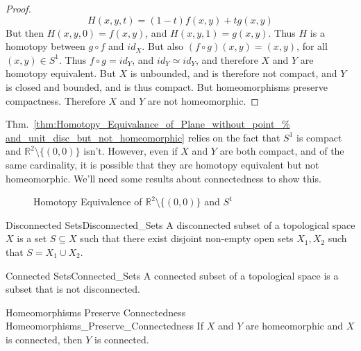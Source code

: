 \documentclass[crop=false,class=book,oneside]{standalone}                      %
\begin{document}
\begin{proof}
                \begin{equation}
                    H(x,y,t)=(1-t)f(x,y)+tg(x,y)
                \end{equation}
                But then $H(x,y,0)=f(x,y)$, and $H(x,y,1)=g(x,y)$. Thus $H$ is a
                homotopy between ${g}\circ{f}$ and $id_{X}$. But also
                $({f}\circ{g})(x,y)=(x,y)$, for all $(x,y)\in S^{1}$.
                Thus ${f}\circ{g}=id_{Y}$, and ${id_{Y}}\simeq{id_{Y}}$,
                and therefore $X$ and $Y$ are homotopy equivalent.
                But $X$ is unbounded, and is therefore not compact,
                and $Y$ is closed and bounded, and is thus compact.
                But homeomorphisms preserve compactness. Therefore $X$
                and $Y$ are not homeomorphic.
            \end{proof}
            Thm.~\ref{thm:Homotopy_Equivalance_of_Plane_without_point_%
                      and_unit_disc_but_not_homeomorphic}
            relies on the fact that $S^{1}$ is compact and
            $\mathbb{R}^{2}\setminus\{(0,0)\}$ isn't. However, even if $X$ and
            $Y$ are both compact, and of the same cardinality, it is possible
            that they are homotopy equivalent but not homeomorphic. We'll need
            some results about connectedness to show this.
            \begin{figure}[H]
                \captionsetup{type=figure}
                \centering
                
                \caption{Homotopy Equivalence of
                         $\mathbb{R}^{2}\setminus\{(0,0)\}$ and $S^{1}$}
                \label{fig:homotopy_equivalence_between_the_plane_%
                       with_a_point_removed_and_the_unit_circle}
            \end{figure}
            \begin{ldefinition}{Disconnected Sets}{Disconnected_Sets}
                A disconnected subset of a topological space $X$ is a set
                $S\subseteq{X}$ such that there exist disjoint non-empty open
                sets $X_{1},X_{2}$ such that $S=X_{1}\cup{X_{2}}$.
            \end{ldefinition}
            \begin{ldefinition}{Connected Sets}{Connected_Sets}
                A connected subset of a topological space
                is a subset that is not disconnected.
            \end{ldefinition}
            \begin{ltheorem}{Homeomorphisms Preserve Connectedness}
                            {Homeomorphisms_Preserve_Connectedness}
                If $X$ and $Y$ are homeomorphic and
                $X$ is connected, then $Y$ is connected.
            \end{ltheorem}
\end{document}
